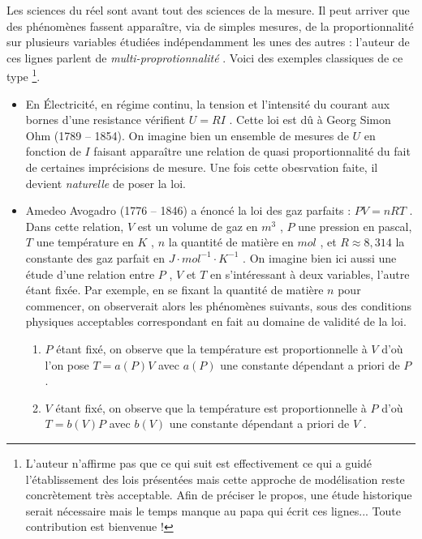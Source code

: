 Les sciences du réel sont avant tout des sciences de la mesure. Il peut arriver que des phénomènes fassent apparaître, via de simples mesures, de la proportionnalité sur plusieurs variables étudiées indépendamment les unes des autres : l'auteur de ces lignes parlent de \emph{\og multi-proprotionnalité \fg}. Voici des exemples classiques de ce type
\footnote{
	L'auteur n'affirme pas que ce qui suit est effectivement ce qui a guidé l'établissement des lois présentées mais cette approche de modélisation reste concrètement très acceptable.
	Afin de préciser le propos, une étude historique serait nécessaire mais le temps manque au papa qui écrit ces lignes...
	Toute contribution est bienvenue !
}.




\begin{itemize}[label=\small\textbullet]
	\item En Électricité, en régime continu, la tension et l'intensité du courant aux bornes d'une resistance vérifient $U = RI$ . Cette loi est dû à Georg Simon Ohm (1789 -- 1854). On imagine bien un ensemble de mesures de $U$ en fonction de $I$ faisant apparaître une relation de quasi proportionnalité du fait de certaines imprécisions de mesure. Une fois cette obesrvation faite, il devient \emph{\og naturelle \fg} de poser la loi. 




	\medskip
	\item Amedeo Avogadro (1776 -- 1846) a énoncé la loi des gaz parfaits : $PV = nRT$ .
	Dans cette relation, $V$ est un volume de gaz en $m^3$ , $P$ une pression en pascal, $T$ une température en $K$ , $n$ la quantité de matière en $mol$ , et $R \approx 8,314$ la constante des gaz parfait en $J \cdot mol^{-1} \cdot K^{-1}$ . On imagine bien ici aussi une étude d'une relation entre $P$ , $V$ et $T$ en s'intéressant à deux variables, l'autre étant fixée. Par exemple, en se fixant la quantité de matière $n$ pour commencer, on observerait alors les phénomènes suivants, sous des conditions physiques acceptables correspondant en fait au domaine de validité de la loi.
	
	\begin{enumerate}[label=(\alph*)]
		\item $P$ étant fixé, on observe que la température est proportionnelle à $V$ d'où l'on pose $T = a(P) V$ avec $a(P)$ une constante dépendant a priori de $P$ .

		\item $V$ étant fixé, on observe que la température est proportionnelle à $P$ d'où $T = b(V) P$ avec $b(V)$ une constante dépendant a priori de $V$ .
	\end{enumerate}


\end{itemize}
